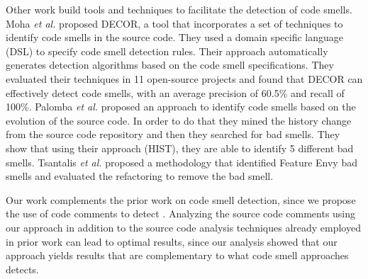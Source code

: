 Other work build tools and techniques to facilitate the detection of code smells. Moha \textit{et al.} \cite{Moha2010TSE} proposed DECOR, a tool that incorporates a set of techniques to identify code smells in the source code. They used a domain specific language (DSL) to specify code smell detection rules. Their approach automatically generates detection algorithms based on the code smell specifications. They evaluated their techniques in 11 open-source projects and found that DECOR can effectively detect code smells, with an average precision of 60.5\% and recall of 100\%. Palomba \textit{et al.} \cite{Palomba2013} proposed an approach to identify code smells based on the evolution of the source code. In order to do that they mined the history change from the source code repository and then they searched for bad smells. They show that using their approach (HIST), they are able to identify 5 different bad smells. Tsantalis \textit{et al.} \cite{Tsantalis2009TSE} proposed a methodology that identified Feature Envy bad smells and evaluated the refactoring to remove the bad smell.

Our work complements the prior work on code smell detection, since we propose the use of code comments to detect \SATD. Analyzing the source code comments using our approach in addition to the source code analysis techniques already employed in prior work can lead to optimal results, since our analysis showed that our approach yields results that are complementary to what code smell approaches detects.